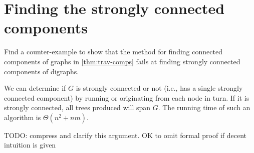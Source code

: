 \section{Finding the strongly connected components}

%


\begin{Boxample}[4]
Find a counter-example to show that the method for finding connected components of graphs 
in \cref{thm:trav-comps} fails at finding strongly connected components of digraphs.
\end{Boxample}


We can determine if $G$ is strongly connected or not (i.e., has a single strongly connected component) by running  or 
originating from each node in turn. If it is strongly connected, all trees produced will span $G$. 
The running time of such an algorithm is $\Theta(n^2+nm)$.

{\color{red} TODO: compress and clarify this argument. OK to omit formal proof if decent intuition is given}

